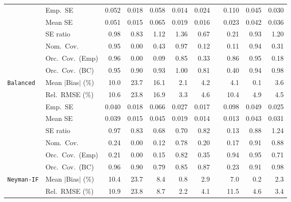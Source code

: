 \begin{landscape}
\begin{longtable}{llrrrrrrrrr}
 & Emp.\ SE & 0.052 & 0.018 & 0.058 & 0.014 & 0.024 &  & 0.110 & 0.045 & 0.030 \\
 & Mean SE & 0.051 & 0.015 & 0.065 & 0.019 & 0.016 &  & 0.023 & 0.042 & 0.036 \\
 & SE ratio & \cellcolor{rankone}0.98 & 0.83 & \cellcolor{rankthree}1.12 & 1.36 & 0.67 &  & 0.21 & \cellcolor{ranktwo}0.93 & 1.20 \\
 & Nom.\ Cov. & \cellcolor{rankone}0.95 & 0.00 & 0.43 & \cellcolor{rankthree}0.97 & 0.12 &  & 0.11 & \cellcolor{ranktwo}0.94 & 0.31 \\
 & Orc.\ Cov.\ (Emp) & \cellcolor{ranktwo}0.96 & 0.00 & 0.09 & 0.85 & 0.33 &  & \cellcolor{rankthree}0.86 & \cellcolor{rankone}0.95 & 0.18 \\
 & Orc.\ Cov.\ (BC) & \cellcolor{rankone}0.95 & 0.90 & \cellcolor{rankthree}0.93 & 1.00 & 0.81 &  & 0.40 & \cellcolor{ranktwo}0.94 & 0.98 \\
\addlinespace[2pt]
\quad \texttt{Balanced} & Mean $|$Bias$|$ (\%) & 10.0 & 23.7 & 16.1 & \cellcolor{ranktwo}2.1 & 4.2 &  & 4.1 & \cellcolor{rankone}0.1 & \cellcolor{rankthree}3.6 \\
 & Rel.\ RMSE (\%) & 10.6 & 23.8 & 16.9 & \cellcolor{rankone}3.3 & \cellcolor{rankthree}4.6 &  & 10.4 & 4.9 & \cellcolor{ranktwo}4.5 \\
 & Emp.\ SE & 0.040 & 0.018 & 0.066 & 0.027 & 0.017 &  & 0.098 & 0.049 & 0.025 \\
 & Mean SE & 0.039 & 0.015 & 0.045 & 0.019 & 0.014 &  & 0.013 & 0.043 & 0.031 \\
 & SE ratio & \cellcolor{rankone}0.97 & \cellcolor{rankthree}0.83 & 0.68 & 0.70 & 0.82 &  & 0.13 & \cellcolor{ranktwo}0.88 & 1.24 \\
 & Nom.\ Cov. & 0.24 & 0.00 & 0.12 & \cellcolor{rankthree}0.78 & 0.20 &  & 0.17 & \cellcolor{rankone}0.91 & \cellcolor{ranktwo}0.88 \\
 & Orc.\ Cov.\ (Emp) & 0.21 & 0.00 & 0.15 & \cellcolor{rankthree}0.82 & 0.35 &  & \cellcolor{ranktwo}0.94 & \cellcolor{rankone}0.95 & 0.71 \\
 & Orc.\ Cov.\ (BC) & \cellcolor{rankone}0.96 & 0.90 & 0.79 & 0.85 & 0.87 &  & 0.23 & \cellcolor{rankthree}0.91 & \cellcolor{ranktwo}0.98 \\
\addlinespace[2pt]
\quad \texttt{Neyman-IF} & Mean $|$Bias$|$ (\%) & 10.4 & 23.7 & 8.4 & \cellcolor{ranktwo}0.8 & 2.9 &  & 7.0 & \cellcolor{rankone}0.2 & \cellcolor{rankthree}2.3 \\
 & Rel.\ RMSE (\%) & 10.9 & 23.8 & 8.7 & \cellcolor{rankone}2.2 & \cellcolor{rankthree}4.1 &  & 11.5 & 4.6 & \cellcolor{ranktwo}3.4 \\

\end{longtable}
\end{landscape}
